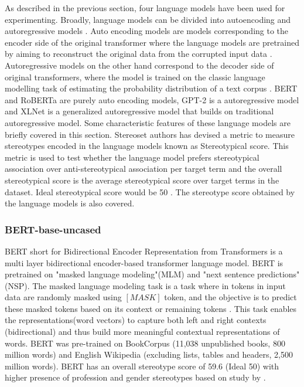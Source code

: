 As described in the previous section, four language models have been used for experimenting. Broadly, language models can be divided into autoencoding and autoregressive models \cite{yang2019xlnet}. Auto encoding models are models corresponding to the encoder side of the original transformer \cite{vaswani2017attention} where the language models are pretrained by aiming to reconstruct the original data from the corrupted input data \cite{yang2019xlnet}. Autoregressive models on the other hand correspond to the decoder side of original transformers, where the model is trained on the classic language modelling task of estimating the probability distribution of a text corpus \cite{yang2019xlnet}. BERT and RoBERTa are purely auto encoding models, GPT-2 is a autoregressive model and XLNet is a generalized autoregressive model that builds on traditional autoregressive model. Some characteristic features of these language models are briefly covered in this section. Stereoset authors has devised a metric to measure stereotypes encoded in the language models known as  Stereotypical score. This metric is used to test whether the language model prefers stereotypical association over anti-stereotypical association per target term \cite{nadeem2020stereoset} and the overall stereotypical score is the average stereotypical score over target terms in the dataset. Ideal stereotypical score would be 50 \cite{nadeem2020stereoset}. The stereotype score obtained by the language models is also covered.   

\subsubsection{BERT-base-uncased}

BERT short for Bidirectional Encoder Representation from Transformers is a multi layer bidirectional encoder-based transformer language model\cite{devlin2018bert}. BERT is pretrained  on "masked language modeling"(MLM) and "next sentence predictions"(NSP). The masked language modeling task is a task where in tokens in input data are randomly masked using $[MASK]$ token, and the objective is to predict these masked tokens based on its context or remaining tokens \cite{devlin2018bert}. This task enables the representations(word vectors) to capture both left and right contexts (bidirectional) and thus build more meaningful contextual representations of words. BERT was pre-trained on BookCorpus (11,038 unpublished books, 800 million words) and English Wikipedia (excluding lists, tables and headers, 2,500 million words). BERT has an overall stereotype score of 59.6 (Ideal 50) with higher presence of profession and gender stereotypes based on study by \cite{nadeem2020stereoset}. 

